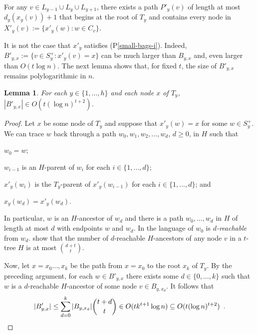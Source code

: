 \documentclass{patmorin}
\newcommand{\pref}[1]{(P\ref{#1})}
\newtheorem{lemma}{Lemma}
\begin{document}
\begin{compactenum}[(P1$'$)]\setcounter{enumi}{1}
    \item For any $v\in L_{y-1}\cup L_y\cup L_{y+1}$, there exists a path $P'_y(v)$ of length at most $d_y(x_y(v))+1$ that begins at the root of $T_y$ and contains every node in $X'_y(v):=\{x'_{y}(w): w\in C_v\}$.\label{clique-path-ii}
\end{compactenum}


It is not the case that $x'_y$ satisfies \pref{small-bags-i}.  Indeed, $B'_{y,x}:=\{v\in S^+_y: x'_y(v)=x\}$ can be much larger than $B_{y,x}$ and, even larger than $O(t\log n)$.  The next lemma shows that, for fixed $t$, the size of $B'_{y,x}$ remains polylogarithmic in $n$.

\begin{lemma}\label{small-bags-ii-lem}
    For each $y\in\{1,\ldots,h\}$ and each node $x$ of $T_y$, $|B'_{y,x}|\in O(t(\log n)^{t+2})$.
\end{lemma}

\begin{proof}
    Let $x$ be some node of $T_y$ and suppose that $x'_y(w)=x$ for some $w\in S^+_y$.  We can trace $w$ back through a path $w_0,w_1,w_2,\ldots,w_d$, $d\ge 0$, in $H$ such that
    \begin{compactenum}[(a)]
        \item $w_0=w$;
        \item $w_{i-1}$ is an $H$-parent of $w_i$ for each $i\in\{1,...,d\}$;
        \item $x'_y(w_{i})$ is the $T_y$-parent of $x'_y(w_{i-1})$ for each $i\in\{1,...,d\}$; and
        \item $x_y(w_d)=x'_y(w_d)$.
    \end{compactenum}
    In particular, $w$ is an $H$-ancestor of $w_d$ and there is a path $w_0,\ldots,w_d$ in $H$ of length at most $d$ with endpoints $w$ and $w_d$.  In the language of \citet{pilipczuk.siebertz:polynomial} $w_0$ is \emph{$d$-reachable} from $w_d$.  \citet[Lemma~13]{pilipczuk.siebertz:polynomial-arxiv} show that the number of $d$-reachable $H$-ancestors of any node $v$ in a $t$-tree $H$ is at most $\binom{d+t}{t}$.

    Now, let $x=x_0\ldots,x_k$ be the path from $x=x_0$ to the root $x_k$ of $T_y$. By the preceding argument, for each $w\in B'_{y,x}$ there exists some $d\in\{0,\ldots,k\}$ such that $w$ is a $d$-reachable $H$-ancestor of some node $v\in B_{y,x_d}$.  It follows that
    \[
        |B'_{y,x}|
            \le \sum_{d=0}^k |B_{y,x_d}|\binom{t+d}{t}
            \in O(tk^{t+1}\log n)
            \subseteq O(t(\log n)^{t+2}) \enspace . \qedhere
    \]
\end{proof}
\end{document}

